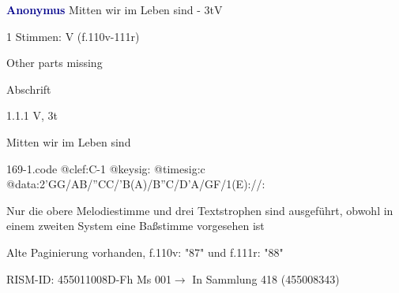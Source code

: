 \documentclass[twocolumn, 12pt]{book}
\begin{document}
\par \vspace{16pt} \textcolor{darkblue}{\textbf{Anonymus  }}\hfillplus{\textbf{[169]}}\newline Mitten wir im Leben sind - 3t\newline V
\par \begin{itshape}\end{itshape} 
\par \textcolor{darkblue}{}  1 Stimmen: V  (f.110v-111r)\newline \begin{small} Other parts missing\end{small} \newline Abschrift
\par 1.1.1  V, 3t\newline \begin{footnotesize} Mitten wir im Leben sind \end{footnotesize}  
\begin{filecontents*}{169-1.code}
@clef:C-1
@keysig:
@timesig:c
@data:2'GG/AB/''CC/'B(A)/B''C/D'A/GF/1(E)://:
\end{filecontents*}
\newline %
\par Nur die obere Melodiestimme und drei Textstrophen sind ausgeführt, obwohl in einem zweiten System eine Baßstimme vorgesehen ist
\par Alte Paginierung vorhanden, f.110v: "87" und f.111r: "88"
\par RISM-ID: 455011008\newline D-Fh  Ms 001\newline $\rightarrow$ In Sammlung 418 (455008343)
      
\end{document}
